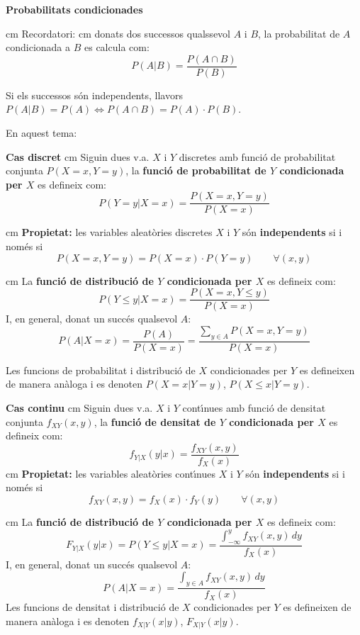 \documentclass{article}
\begin{document}
\noindent
\textbf{\large Probabilitats condicionades}

 cm
\noindent
Recordatori:
 cm
donats dos successos qualssevol $A$ i $B$, la probabilitat de $A$ condicionada a $B$ es calcula com:
\[
P(A|B)=\frac{P(A \cap B)}{P(B)}
\]

Si els successos s\'on independents, llavors $P(A|B)=P(A) \Leftrightarrow P(A \cap B)=P(A) \cdot P(B)$.


\vskip 0.5cm
\noindent
En aquest tema:


\vskip 0.2cm
\noindent
\textbf{Cas discret}
 cm
Siguin dues v.a. $X$ i $Y$ discretes amb funci\'o de probabilitat conjunta $P(X=x, Y=y)$, la 
\textbf{funci\'o de probabilitat de $Y$ condicionada per $X$} es defineix com:
\[
P(Y=y|X=x)=\frac{P(X=x, Y=y)}{P(X=x)}
\]

 cm
\noindent
\textbf{Propietat:} les variables aleat\`ories discretes $X$ i $Y$ s\'on \textbf{independents} si i nom\'es si 
\[
P(X=x, Y=y)=P(X=x) \cdot P(Y=y) \qquad \forall (x, y)
\]

 cm
\noindent
La \textbf{funci\'o de distribuci\'o de $Y$ condicionada per $X$} es defineix com:
\[
P(Y \leq y|X=x)=\frac{P(X=x, Y \leq y)}{P(X=x)}
\]
\noindent
I, en general, donat un succ\'es qualsevol $A$:
\[
P(A|X=x)=\frac{P(A)}{P(X=x)}=\frac{\sum_{y \in A} P(X=x, Y=y)}{P(X=x)}
\]

Les funcions de probabilitat i distribuci\'o de $X$ condicionades per $Y$ es defineixen de manera
an\`aloga i es denoten $P(X=x|Y=y)$, $P(X \leq x|Y=y)$.

\vskip 0.2cm
\noindent
\textbf{Cas continu}
 cm
Siguin dues v.a. $X$ i $Y$ cont\'\i nues amb funci\'o de densitat conjunta $f_{XY}(x, y)$, la 
\textbf{funci\'o de densitat de $Y$ condicionada per $X$} es defineix com:
\[
f_{Y|X}(y|x)=\frac{f_{XY}(x, y)}{f_X(x)}
\]
 cm
\noindent
\textbf{Propietat:} les variables aleat\`ories cont\'\i nues $X$ i $Y$ s\'on \textbf{independents} si i nom\'es si 
\[
f_{XY}(x, y)=f_X(x) \cdot f_Y(y) \qquad \forall (x, y)
\]

 cm
\noindent
La \textbf{funci\'o de distribuci\'o de $Y$ condicionada per $X$} es defineix com:
\[
F_{Y|X}(y|x)=P(Y \leq y | X=x)=\frac{\int_{-\infty}^y f_{XY}(x, y) \, dy}{f_X(x)}
\]
\noindent
I, en general, donat un succ\'es qualsevol $A$:
\[
P(A|X=x)=\frac{\int_{y \in A} f_{XY}(x, y) \, dy}{f_X(x)}
\]
Les funcions de densitat i distribuci\'o de $X$ condicionades per $Y$ es defineixen de manera
an\`aloga i es denoten $f_{X|Y}(x|y)$, $F_{X|Y}(x|y)$.
\end{document}
